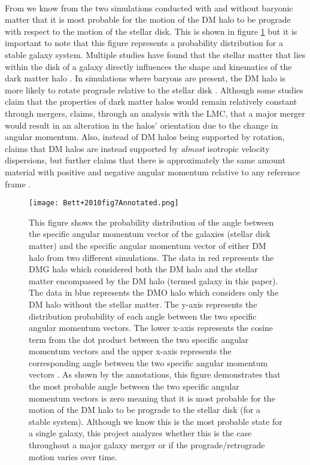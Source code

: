 \documentclass[fleqn,usenatbib]{mnras}
\begin{document}
\paragraph{} From \cite{Bett+2010} we know from the two simulations conducted with and without baryonic matter that it is most probable for the motion of the DM halo to be prograde with respect to the motion of the stellar disk. This is shown in figure \ref{fig:Bett+2010} but it is important to note that this figure represents a probability distribution for a stable galaxy system. Multiple studies have found that the stellar matter that lies within the disk of a galaxy directly influences the shape and kinematics of the dark matter halo \citep{Prada+2019, Bett+2010}. In simulations where baryons are present, the DM halo is more likely to rotate prograde relative to the stellar disk \citep{Bett+2010}. Although some studies claim that the properties of dark matter halos would remain relatively constant through mergers, \cite{Baptista+2023} claims, through an analysis with the LMC, that a major merger would result in an alteration in the halos' orientation due to the change in angular momentum. Also, instead of DM halos being supported by rotation, \cite{Diemand+2011} claims that DM halos are instead supported by \textit{almost} isotropic velocity dispersions, but further claims that there is approximately the same amount material with positive and negative angular momentum relative to any reference frame \citep{Diemand+2011}.

\begin{figure}[H]
    \centering
    \texttt{[image: Bett+2010fig7Annotated.png]}
    \caption{This figure shows the probability distribution of the angle between the specific angular momentum vector of the galaxies (stellar disk matter) and the specific angular momentum vector of either DM halo from two different simulations. The data in red represents the DMG halo which considered both the DM halo and the stellar matter encompassed by the DM halo (termed galaxy in this paper). The data in blue represents the DMO halo which considers only the DM halo without the stellar matter. The y-axis represents the distribution probability of each angle between the two specific angular momentum vectors. The lower x-axis represents the cosine term from the dot product between the two specific angular momentum vectors and the upper x-axis represents the corresponding angle between the two specific angular momentum vectors \citep{Bett+2010}. As shown by the annotations, this figure demonstrates that the most probable angle between the two specific angular momentum vectors is zero meaning that it is most probable for the motion of the DM halo to be prograde to the stellar disk (for a stable system). Although we know this is the most probable state for a single galaxy, this project analyzes whether this is the case throughout a major galaxy merger or if the prograde/retrograde motion varies over time.}
    \label{fig:Bett+2010}
\end{figure}
\end{document}
